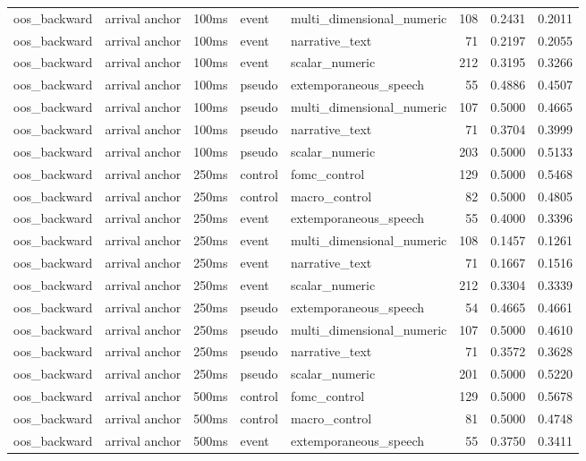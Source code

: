 \begin{tabular}{lllllrrr}
oos_backward & arrival anchor & 100ms & event & multi_dimensional_numeric & 108 & 0.2431 & 0.2011 \\
oos_backward & arrival anchor & 100ms & event & narrative_text & 71 & 0.2197 & 0.2055 \\
oos_backward & arrival anchor & 100ms & event & scalar_numeric & 212 & 0.3195 & 0.3266 \\
oos_backward & arrival anchor & 100ms & pseudo & extemporaneous_speech & 55 & 0.4886 & 0.4507 \\
oos_backward & arrival anchor & 100ms & pseudo & multi_dimensional_numeric & 107 & 0.5000 & 0.4665 \\
oos_backward & arrival anchor & 100ms & pseudo & narrative_text & 71 & 0.3704 & 0.3999 \\
oos_backward & arrival anchor & 100ms & pseudo & scalar_numeric & 203 & 0.5000 & 0.5133 \\
oos_backward & arrival anchor & 250ms & control & fomc_control & 129 & 0.5000 & 0.5468 \\
oos_backward & arrival anchor & 250ms & control & macro_control & 82 & 0.5000 & 0.4805 \\
oos_backward & arrival anchor & 250ms & event & extemporaneous_speech & 55 & 0.4000 & 0.3396 \\
oos_backward & arrival anchor & 250ms & event & multi_dimensional_numeric & 108 & 0.1457 & 0.1261 \\
oos_backward & arrival anchor & 250ms & event & narrative_text & 71 & 0.1667 & 0.1516 \\
oos_backward & arrival anchor & 250ms & event & scalar_numeric & 212 & 0.3304 & 0.3339 \\
oos_backward & arrival anchor & 250ms & pseudo & extemporaneous_speech & 54 & 0.4665 & 0.4661 \\
oos_backward & arrival anchor & 250ms & pseudo & multi_dimensional_numeric & 107 & 0.5000 & 0.4610 \\
oos_backward & arrival anchor & 250ms & pseudo & narrative_text & 71 & 0.3572 & 0.3628 \\
oos_backward & arrival anchor & 250ms & pseudo & scalar_numeric & 201 & 0.5000 & 0.5220 \\
oos_backward & arrival anchor & 500ms & control & fomc_control & 129 & 0.5000 & 0.5678 \\
oos_backward & arrival anchor & 500ms & control & macro_control & 81 & 0.5000 & 0.4748 \\
oos_backward & arrival anchor & 500ms & event & extemporaneous_speech & 55 & 0.3750 & 0.3411 \\

\end{tabular}
